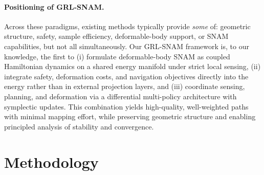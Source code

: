 \documentclass{article} %
\begin{document}
\paragraph{Positioning of GRL-SNAM.}
Across these paradigms, existing methods typically provide \emph{some} of: geometric structure, safety, sample efficiency, deformable-body support, or SNAM capabilities, but not all simultaneously. Our GRL-SNAM framework is, to our knowledge, the first to (i) formulate deformable-body SNAM as coupled Hamiltonian dynamics on a shared energy manifold under strict local sensing, (ii) integrate safety, deformation costs, and navigation objectives directly into the energy rather than in external projection layers, and (iii) coordinate sensing, planning, and deformation via a differential multi-policy architecture with symplectic updates. This combination yields high-quality, well-weighted paths with minimal mapping effort, while preserving geometric structure and enabling principled analysis of stability and convergence.


\section{Methodology}
\label{sec:method}
\providecommand{\Ham}{\mathcal{H}}          %
\providecommand{\Energy}{\mathcal{E}}       %
\providecommand{\Potential}{\mathcal{R}}    %
\providecommand{\Constraints}{\mathcal{C}}  %
\providecommand{\Response}{\mathsf{R}}      %
\providecommand{\Navigator}{\mathsf{N}}     %
\providecommand{\PhaseState}{z}                  %
\providecommand{\Pos}{q}                    %
\providecommand{\Mom}{p}                    %
\providecommand{\Mass}{\mathrm{M}}          %
\providecommand{\J}{\mathbb{J}}             %
\providecommand{\Lag}{\mathscr{L}}          %
\providecommand{\res}{\mathbf{r}}           %
\providecommand{\mult}{\boldsymbol{\lambda}}%
\providecommand{\pen}{\boldsymbol{\rho}}    %
\end{document}

